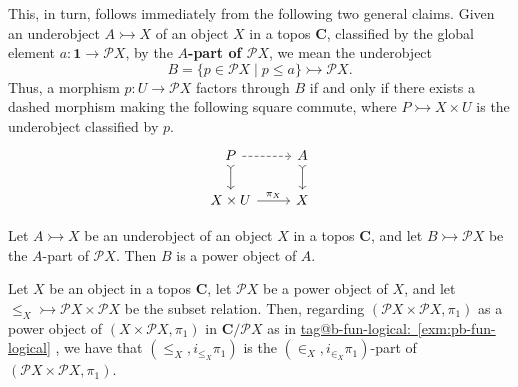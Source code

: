 \documentclass{amsart}
\makeatletter
\newcommand\bC{\mathbf{C}}
\newcommand\defword[1]{{\boldmath \textbf{#1}}}
\newcommand\pow{\mathcal{P}}
\newcommand\set[2][]{#1\{ #2 #1\}}
\newcommand\tm{\mathbf{1}}
\newcommand\tto{\rightarrowtail}
\newcommand\tagword[1]{\csname tag@#1\endcsname}
\def\label@tag#1:#2\@nil{#1}
\newcommand\labeltag[1]{\label@tag#1:\@nil}
\newcommand\jref[1]{%
  \texorpdfstring%
    {\hyperref[#1]{\tagword{\labeltag{#1}}~\ref*{#1}}}%
    {\tagword{\labeltag{#1}}~\ref*{#1}}%
}
\theoremstyle{definition}
\theoremstyle{remark}
\theoremstyle{plainwithref}
\makeatother
\begin{document}
This, in turn, follows immediately from the following two general claims.
Given an underobject \( A \tto X \) of an object \( X \) in a topos \( \bC \), classified by the global element \( a \colon \tm \to \pow X \), by the \defword{\boldmath \( A \)-part of \( \pow X \)}, we mean the underobject
  \[
    B = \set{p \in \pow X \mid p \le a} \tto \pow X.
  \]
  Thus, a morphism \( p \colon U \to \pow X \) factors through \( B \) if and only if there exists a dashed morphism making the following square commute, where \( P \tto X \times U \) is the underobject classified by \( p \).
  \[
    \begin{tikzcd}
      P \ar[r, dashed] \ar[d, >->] & A \ar[d, >->] \\
      X \times U \ar[r, "\pi_X"] & X
    \end{tikzcd}
  \]
\begin{claim} \label{claim:part-is-pow}
  Let \( A \tto X \) be an underobject of an object \( X \) in a topos \( \bC \), and let \( B \tto \pow X \) be the \( A \)-part of \( \pow X \).
  Then \( B \) is a power object of \( A \).
\end{claim}

\begin{claim} \label{claim:sub-is-el-part}
  Let \( X \) be an object in a topos \( \bC \), let \( \pow X \) be a power object of \( X \), and let \( {\le_X} \tto \pow X \times \pow X \) be the subset relation.
  Then, regarding \( (\pow X \times \pow X, \pi_1) \) as a power object of \( (X \times \pow X, \pi_1) \) in \( \bC / \pow X \) as in \jref{exm:pb-fun-logical}, we have that \( (\le_X, i_{\le_X} \pi_1) \) is the \( (\in_{X}, i_{\in_{X}} \pi_1) \)-part of \( (\pow X \times \pow X, \pi_1) \).
\end{claim}
\end{document}
